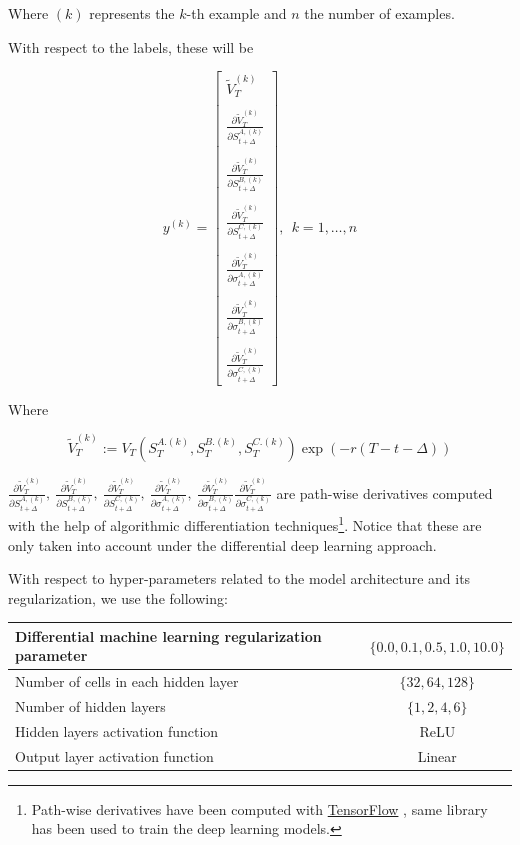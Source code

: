 Where $(k)$ represents the $k$-th example and $n$ the number of examples.

With respect to the labels, these will be 

$$
y^{(k)}=\left[\begin{array}{l}
\tilde{V}_{T}^{(k)} \\ \\
\frac{\partial \tilde{V}_{T}^{(k)}}{\partial S_{t+\Delta}^{A,(k)}} \\ \\
\frac{\partial \tilde{V}_{T}^{(k)}}{\partial S_{t+\Delta}^{B,(k)}} \\ \\
\frac{\partial \tilde{V}_{T}^{(k)}}{\partial S_{t+\Delta}^{C,(k)}} \\ \\
\frac{\partial \tilde{V}_{T}^{(k)}}{\partial \sigma_{t+\Delta}^{A,(k)}} \\ \\
\frac{\partial \tilde{V}_{T}^{(k)}}{\partial \sigma_{t+\Delta}^{B,(k)}} \\ \\
\frac{\partial \tilde{V}_{T}^{(k)}}{\partial \sigma_{t+\Delta}^{C,(k)}}
\end{array}\right],\ \ k=1, \ldots, n
$$

Where

$$\tilde{V}_{T}^{(k)} := V_T\left(S_T^{A.(k)}, S_T^{B.(k)}, S_T^{
C.(k)}\right)\exp\left(-r\left(T-t-\Delta\right)\right)$$

$\frac{\partial \tilde{V}_{T}^{(k)}}{\partial S_{t+\Delta}^{A,(k)}},\  
\frac{\partial \tilde{V}_{T}^{(k)}}{\partial S_{t+\Delta}^{B,(k)}},\ 
\frac{\partial \tilde{V}_{T}^{(k)}}{\partial S_{t+\Delta}^{C,(k)}},\ 
\frac{\partial \tilde{V}_{T}^{(k)}}{\partial \sigma_{t+\Delta}^{A,(k)}},\ 
\frac{\partial \tilde{V}_{T}^{(k)}}{\partial \sigma_{t+\Delta}^{B,(k)}}
\frac{\partial \tilde{V}_{T}^{(k)}}{\partial \sigma_{t+\Delta}^{C,(k)}}
$ are path-wise derivatives computed with the help of algorithmic differentiation techniques\footnote{Path-wise derivatives have been computed with \href{www.Tensorflow.org}{TensorFlow} , same library has been used to train the deep learning models. }. Notice that these are only taken into account under the differential deep learning approach.

With respect to hyper-parameters related to the model architecture and its regularization, we use the following:

\begin{center}
\begin{tabular}{||l | c||} 
 \hline
 Differential machine learning regularization parameter & $\{0.0, 0.1, 0.5, 1.0, 10.0\}$ \\
 \hline
 Number of cells in each hidden layer  & $\{32, 64, 128\}$  \\
 \hline
 Number of hidden layers  & $\{1 ,2 ,4 ,6\}$  \\
 \hline
 Hidden layers activation function  & ReLU  \\
 \hline
 Output layer activation function  & Linear  \\
 \hline
 
 \end{tabular}
\end{center}


